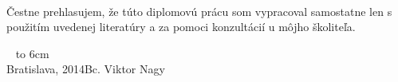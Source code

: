 \documentclass[12pt, a4paper, oneside]{book}
\newcommand\mfauthor{Bc. Viktor Nagy}
\newcommand\mfplacedate{Bratislava, 2014}
\begin{document}
\begin{figure}[H]
\begin{center}
\label{img:zadanie}
\end{center}
\end{figure}


\noindent
\begin{minipage}{0.25\textwidth}~\end{minipage}
\begin{minipage}{0.75\textwidth}
Čestne prehlasujem, že túto diplomovú prácu som vypracoval samostatne len s použitím uvedenej literatúry a za pomoci konzultácií u môjho školiteľa.
\newline \newline
\end{minipage}
\vfill
~ \hfill {\hbox to 6cm{\dotfill}} \\
\mfplacedate \hfill \mfauthor
\vfill\eject
\end{document}
